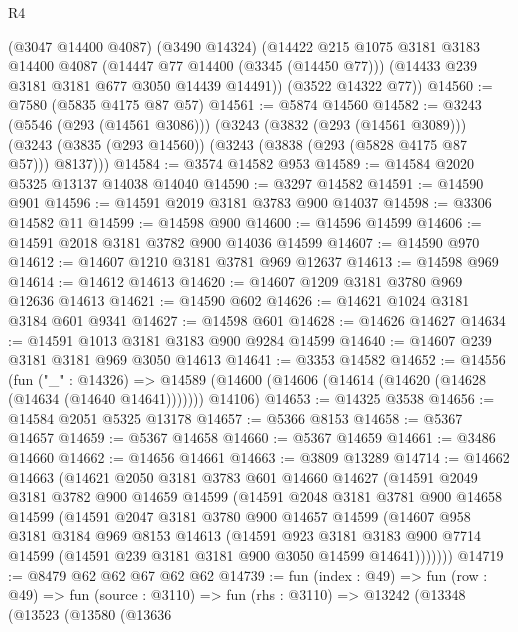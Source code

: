 \begin{lexlean}{R4}
\begin{coremodule}
      (@3047 @14400 @4087)
      (@3490 @14324)
      (@14422
        @215
        @1075
        @3181
        @3183
        @14400
        @4087
        (@14447 @77 @14400 (@3345 (@14450 @77)))
        (@14433 @239 @3181 @3181 @677 @3050 @14439 @14491))
      (@3522 @14322 @77))
@14560 := @7580 (@5835 @4175 @87 @57)
@14561 := @5874 @14560
@14582 := @3243
    (@5546 (@293 (@14561 @3086)))
    (@3243
      (@3832 (@293 (@14561 @3089)))
      (@3243 (@3835 (@293 @14560)) (@3243 (@3838 (@293 (@5828 @4175 @87 @57))) @8137)))
@14584 := @3574 @14582 @953
@14589 := @14584 @2020 @5325 @13137 @14038 @14040
@14590 := @3297 @14582
@14591 := @14590 @901
@14596 := @14591 @2019 @3181 @3783 @900 @14037
@14598 := @3306 @14582 @11
@14599 := @14598 @900
@14600 := @14596 @14599
@14606 := @14591 @2018 @3181 @3782 @900 @14036 @14599
@14607 := @14590 @970
@14612 := @14607 @1210 @3181 @3781 @969 @12637
@14613 := @14598 @969
@14614 := @14612 @14613
@14620 := @14607 @1209 @3181 @3780 @969 @12636 @14613
@14621 := @14590 @602
@14626 := @14621 @1024 @3181 @3184 @601 @9341
@14627 := @14598 @601
@14628 := @14626 @14627
@14634 := @14591 @1013 @3181 @3183 @900 @9284 @14599
@14640 := @14607 @239 @3181 @3181 @969 @3050 @14613
@14641 := @3353 @14582
@14652 := @14556
    (fun ("_" : @14326) =>
    @14589 (@14600 (@14606 (@14614 (@14620 (@14628 (@14634 (@14640 @14641))))))) @14106)
@14653 := @14325 @3538
@14656 := @14584 @2051 @5325 @13178
@14657 := @5366 @8153
@14658 := @5367 @14657
@14659 := @5367 @14658
@14660 := @5367 @14659
@14661 := @3486 @14660
@14662 := @14656 @14661
@14663 := @3809 @13289
@14714 := @14662
    @14663
    (@14621
      @2050
      @3181
      @3783
      @601
      @14660
      @14627
      (@14591
        @2049
        @3181
        @3782
        @900
        @14659
        @14599
        (@14591
          @2048
          @3181
          @3781
          @900
          @14658
          @14599
          (@14591
            @2047
            @3181
            @3780
            @900
            @14657
            @14599
            (@14607
              @958
              @3181
              @3184
              @969
              @8153
              @14613
              (@14591
                @923
                @3181
                @3183
                @900
                @7714
                @14599
                (@14591 @239 @3181 @3181 @900 @3050 @14599 @14641)))))))
@14719 := @8479 @62 @62 @67 @62 @62
@14739 := fun (index : @49) =>
  fun (row : @49) =>
  fun (source : @3110) =>
  fun (rhs : @3110) =>
  @13242
    (@13348
      (@13523
        (@13580
          (@13636

\end{coremodule}
\end{lexlean}

